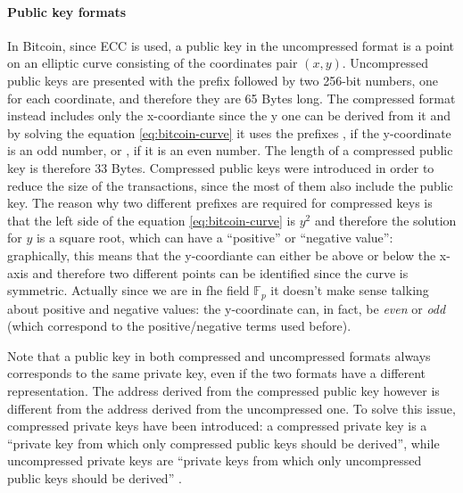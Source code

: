 \paragraph{Public key formats} In Bitcoin, since ECC is used, a public key in
the uncompressed format is a point on an elliptic curve consisting of the
coordinates pair $(x,y)$. Uncompressed public keys are presented with the prefix
 followed by two 256-bit numbers, one for each coordinate, and
therefore they are 65 Bytes long. The compressed format instead includes only
the x-coordiante since the y one can be derived from it and by solving the
equation \eqref{eq:bitcoin-curve} it uses the prefixes , if the
y-coordinate is an odd number, or , if it is an even number. The length
of a compressed public key is therefore 33 Bytes. Compressed public keys were
introduced in order to reduce the size of the transactions, since the most of
them also include the public key. The reason why two different prefixes are
required for compressed keys is that the left side of the equation
\eqref{eq:bitcoin-curve} is $y^2$ and therefore the solution for $y$ is a square
root, which can have a ``positive'' or ``negative value'': graphically, this
means that the y-coordiante can either be above or below the x-axis and
therefore two different points can be identified since the curve is symmetric.
Actually since we are in fhe field $\mathbb{F}_p$ it doesn't make sense talking
about positive and negative values: the y-coordinate can, in fact, be
\emph{even} or \emph{odd} (which correspond to the positive/negative terms used
before).

Note that a public key in both compressed and uncompressed formats always
corresponds to the same private key, even if the two formats have a different
representation. The address derived from the compressed public key however is
different from the address derived from the uncompressed one. To solve this
issue, compressed private keys have been introduced: a compressed private key is
a ``private key from which only compressed public keys should be derived'',
while uncompressed private keys are ``private keys from which only uncompressed
public keys should be derived'' \cite{antonopoulos2017mastering}.











